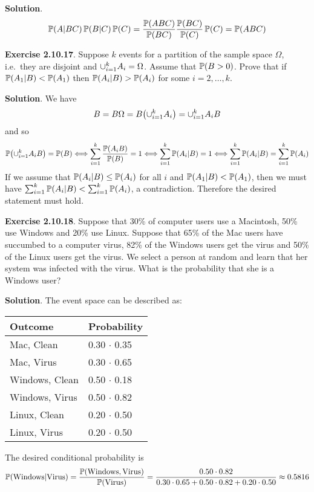 \textbf{Solution}.
\[
\operatorname{\mathbb{P}}(A | BC) \operatorname{\mathbb{P}}(B | C) \operatorname{\mathbb{P}}(C) = \frac{\operatorname{\mathbb{P}}(ABC)}{\operatorname{\mathbb{P}}(BC)}  \frac{\operatorname{\mathbb{P}}(BC)}{\operatorname{\mathbb{P}}(C)} \operatorname{\mathbb{P}}(C) = \operatorname{\mathbb{P}}(ABC)
\]

\textbf{Exercise 2.10.17}. Suppose \(k\) events for a partition of the
sample space \(\Omega\), i.e.~they are disjoint and
\(\cup_{i=1}^{k} A_{i} = \Omega\). Assume that \(\operatorname{\mathbb{P}}(B > 0)\). Prove
that if \(\operatorname{\mathbb{P}}(A_{1} | B) < \operatorname{\mathbb{P}}(A_{1})\) then
\(\operatorname{\mathbb{P}}(A_{i} | B) > \operatorname{\mathbb{P}}(A_{i})\) for some \(i = 2, \dots, k\).

\textbf{Solution}.
We have
\[
B = B\Omega = B \left( \union_{i=1}^{k} A_{i} \right) = \union_{i=1}^{k} A_{i} B
\]
and so
\[
\PROB\left( \union_{i=1}^{k} A_{i} B \right) = \PROB(B) 
\Longleftrightarrow \sum_{i=1}^{k} \frac{\PROB(A_{i} B)}{\PROB(B)} = 1
\Longleftrightarrow \sum_{i=1}^{k} \PROB(A_{i} | B) = 1
\Longleftrightarrow \sum_{i=1}^{k} \PROB(A_{i} | B) = \sum_{i=1}^{k} \PROB(A_{i})
\]
If we assume that \(\operatorname{\mathbb{P}}(A_{i} | B) \leq \operatorname{\mathbb{P}}(A_{i})\) for all
\(i\) and \(\operatorname{\mathbb{P}}(A_{1} | B) < \operatorname{\mathbb{P}}(A_{1})\), then we must have
\(\sum_{i=1}^{k} \operatorname{\mathbb{P}}(A_{i} | B) < \sum_{i=1}^{k} \operatorname{\mathbb{P}}(A_{i})\), a
contradiction. Therefore the desired statement must hold.

\textbf{Exercise 2.10.18}. Suppose that 30\% of computer users use a
Macintosh, 50\% use Windows and 20\% use Linux. Suppose that 65\% of the
Mac users have succumbed to a computer virus, 82\% of the Windows users
get the virus and 50\% of the Linux users get the virus. We select a
person at random and learn that her system was infected with the virus.
What is the probability that she is a Windows user?

\textbf{Solution}. The event space can be described as:
\begin{table}[H]
\centering
\begin{tabular}{@{}ll@{}}
\toprule
Outcome & Probability \\
\midrule
Mac, Clean      & 0.30 $\cdot$ 0.35 \\
Mac, Virus      & 0.30 $\cdot$ 0.65 \\
Windows, Clean  & 0.50 $\cdot$ 0.18 \\
Windows, Virus  & 0.50 $\cdot$ 0.82 \\
Linux, Clean    & 0.20 $\cdot$ 0.50 \\
Linux, Virus    & 0.20 $\cdot$ 0.50 \\
\bottomrule
\end{tabular}
\end{table}
The desired conditional probability is
\[
\operatorname{\mathbb{P}}(\text{Windows} | \text{Virus}) = \frac{\operatorname{\mathbb{P}}(\text{Windows}, \text{Virus})}{\operatorname{\mathbb{P}}(\text{Virus})}
= \frac{0.50 \cdot 0.82}{0.30 \cdot 0.65 + 0.50 \cdot 0.82 + 0.20 \cdot 0.50} \approx 0.5816
\]

